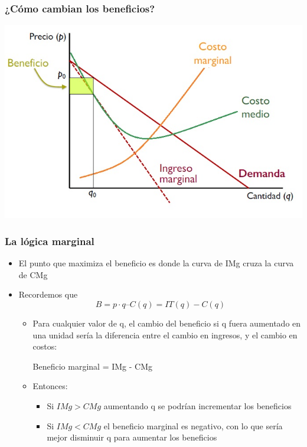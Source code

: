 \documentclass{beamer}
\begin{document}
\begin{frame}
\frametitle{¿Cómo cambian los beneficios?}
\includegraphics[scale=0.6]{../Figures/Tema_06.34_beneficios.jpg}
\end{frame}

\begin{frame}
\frametitle{La lógica marginal}
    \begin{itemize}
        \item El punto que maximiza el beneficio es donde la curva de IMg cruza la curva de CMg\vspace{4mm}
        \item Recordemos que 
        \[B = p·q – C(q) = IT(q) - C(q)\]
        \begin{itemize}
            \item Para cualquier valor de q, el cambio del beneficio si q fuera aumentado en una unidad sería la diferencia entre el cambio en ingresos, y el cambio en costos: \vspace{2mm} \\ \hspace{10mm}
            \begin{center} Beneficio marginal = IMg - CMg \end{center}
            \item Entonces:
            \begin{itemize}
                \item Si $IMg > CMg$ aumentando q se podrían incrementar los beneficios \\
                \item Si $IMg < CMg$ el beneficio marginal es negativo, con lo que sería mejor disminuir q para aumentar los beneficios
            \end{itemize}
        \end{itemize}
    \end{itemize}
\end{frame}
\end{document}
